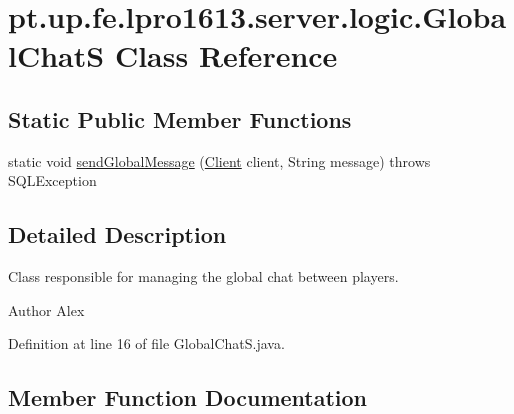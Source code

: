 \hypertarget{classpt_1_1up_1_1fe_1_1lpro1613_1_1server_1_1logic_1_1_global_chat_s}{}\section{pt.\+up.\+fe.\+lpro1613.\+server.\+logic.\+Global\+ChatS Class Reference}
\label{classpt_1_1up_1_1fe_1_1lpro1613_1_1server_1_1logic_1_1_global_chat_s}
\subsection*{Static Public Member Functions}
\begin{DoxyCompactItemize}
\item 
static void \hyperlink{classpt_1_1up_1_1fe_1_1lpro1613_1_1server_1_1logic_1_1_global_chat_s_add5e38be43ae6a703ba3865221171ca5}{send\+Global\+Message} (\hyperlink{classpt_1_1up_1_1fe_1_1lpro1613_1_1server_1_1conn_1_1_client}{Client} client, String message)  throws S\+Q\+L\+Exception 
\end{DoxyCompactItemize}


\subsection{Detailed Description}
Class responsible for managing the global chat between players.

\begin{DoxyAuthor}{Author}
Alex 
\end{DoxyAuthor}


Definition at line 16 of file Global\+Chat\+S.\+java.



\subsection{Member Function Documentation}
\hypertarget{classpt_1_1up_1_1fe_1_1lpro1613_1_1server_1_1logic_1_1_global_chat_s_add5e38be43ae6a703ba3865221171ca5}{}\label{classpt_1_1up_1_1fe_1_1lpro1613_1_1server_1_1logic_1_1_global_chat_s_add5e38be43ae6a703ba3865221171ca5} 
